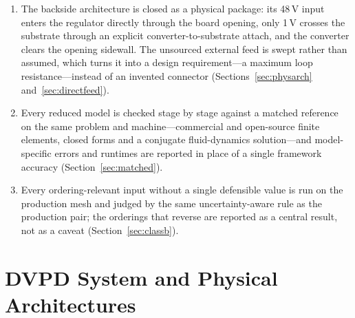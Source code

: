 \documentclass[journal]{IEEEtran}
\begin{document}
\begin{enumerate}
\item The backside architecture is closed as a physical package: its 48\,V input enters the
regulator directly through the board opening, only 1\,V crosses the substrate through an
explicit converter-to-substrate attach, and the converter clears the opening sidewall. The
unsourced external feed is swept rather than assumed, which turns it into a design
requirement---a maximum loop resistance---instead of an invented connector
(Sections~\ref{sec:physarch} and~\ref{sec:directfeed}).

\item Every reduced model is checked stage by stage against a matched reference on the same
problem and machine---commercial and open-source finite elements, closed forms and a conjugate
fluid-dynamics solution---and model-specific errors and runtimes are reported in place of a
single framework accuracy (Section~\ref{sec:matched}).

\item Every ordering-relevant input without a single defensible value is run on the production
mesh and judged by the same uncertainty-aware rule as the production pair; the orderings that
reverse are reported as a central result, not as a caveat (Section~\ref{sec:classb}).
\end{enumerate}

\section{DVPD System and Physical Architectures}\label{sec:system}
\end{document}
